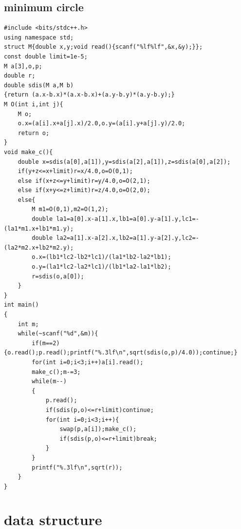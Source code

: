 \documentclass[10pt,twocolumn,oneside]{article}
\begin{document}
\subsection{minimum circle}
\begin{lstlisting}
#include <bits/stdc++.h>
using namespace std;
struct M{double x,y;void read(){scanf("%lf%lf",&x,&y);}};
const double limit=1e-5;
M a[3],o,p;
double r;
double sdis(M a,M b)
{return (a.x-b.x)*(a.x-b.x)+(a.y-b.y)*(a.y-b.y);}
M O(int i,int j){
	M o;
	o.x=(a[i].x+a[j].x)/2.0,o.y=(a[i].y+a[j].y)/2.0;
	return o;
}
void make_c(){
	double x=sdis(a[0],a[1]),y=sdis(a[2],a[1]),z=sdis(a[0],a[2]);
	if(y+z<=x+limit)r=x/4.0,o=O(0,1);
	else if(x+z<=y+limit)r=y/4.0,o=O(2,1);
	else if(x+y<=z+limit)r=z/4.0,o=O(2,0);
	else{
		M m1=O(0,1),m2=O(1,2);
		double la1=a[0].x-a[1].x,lb1=a[0].y-a[1].y,lc1=-(la1*m1.x+lb1*m1.y);
		double la2=a[1].x-a[2].x,lb2=a[1].y-a[2].y,lc2=-(la2*m2.x+lb2*m2.y);
		o.x=(lb1*lc2-lb2*lc1)/(la1*lb2-la2*lb1);
		o.y=(la1*lc2-la2*lc1)/(lb1*la2-la1*lb2);
		r=sdis(o,a[0]);
	}
}
int main()
{
	int m;
	while(~scanf("%d",&m)){
		if(m==2){o.read();p.read();printf("%.3lf\n",sqrt(sdis(o,p)/4.0));continue;}
		for(int i=0;i<3;i++)a[i].read();
		make_c();m-=3;
		while(m--)
		{
			p.read();
			if(sdis(p,o)<=r+limit)continue;
			for(int i=0;i<3;i++){
				swap(p,a[i]);make_c();
				if(sdis(p,o)<=r+limit)break;
			}
		}
		printf("%.3lf\n",sqrt(r));
	}
}

\end{lstlisting}
\section{data structure}
\end{document}
